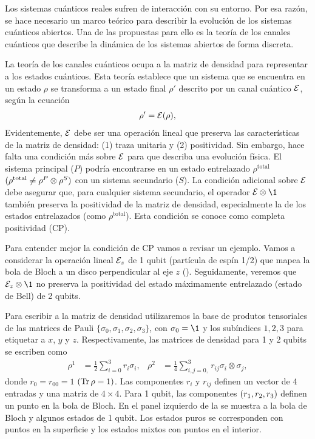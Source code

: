 Los sistemas cuánticos reales sufren de interacción con su entorno.
Por esa razón, se hace necesario un marco teórico para describir 
la evolución de los sistemas cuánticos abiertos. Una de las propuestas
para ello es la teoría de los canales cuánticos que describe la dinámica de 
los sistemas abiertos de forma discreta. 

La teoría de los canales cuánticos ocupa a la matriz de densidad para 
representar a los estados cuánticos. Esta teoría establece que un 
sistema que se encuentra en un estado $\rho$ se transforma a un 
estado final $\rho'$ descrito por un canal cuántico
$\mathcal{E}$, según la ecuación~\cite{nielsen_chuang_2011}
\begin{align} \label{eq:E(rho)}
\rho' = \mathcal{E} (\rho),
\end{align} 
Evidentemente, $\mathcal{E}$ debe ser una operación lineal 
que preserva las características de la matriz de densidad: (1) traza
unitaria y (2) positividad. Sin embargo, hace falta una condición 
más sobre $\mathcal{E}$ para que describa una evolución física. El sistema
principal ($P$) podría encontrarse en un estado entrelazado 
$\rho^{\text{total}}$ $(\rho^{\text{total}}\neq \rho^P\otimes\rho^S)$ 
con un sistema secundario ($S$). La condición adicional sobre $\mathcal{E}$ 
debe asegurar que, para cualquier sistema secundario, el operador $\E\ot\1$ 
también preserva la positividad de la matriz de densidad, especialmente 
la de los estados entrelazados (como $\rho^{\text{total}}$). Esta 
condición se conoce como completa positividad (CP).

Para entender mejor la condición de CP vamos a revisar un 
ejemplo. Vamos a considerar la operación lineal $\mathcal{E}_z$ de 1 qubit (partícula
de espín 1/2) que mapea la bola de Bloch a un disco perpendicular 
al eje $z$ (). 
Seguidamente, veremos que $\E_z \ot\1$ no preserva la
positividad del estado máximamente entrelazado (estado de Bell)
de 2 qubits.

Para escribir a la matriz de densidad utilizaremos 
la base de produtos tensoriales de las matrices de Pauli
$\{ \sigma_0, \sigma_1, \sigma_2, \sigma_3\}$,
con $\sigma_0=\1$ y los subíndices $1,2,3$ para etiquetar a $x$, $y$ y $z$.
Respectivamente, las matrices de densidad para 1 y 2 qubits se 
escriben como~\cite{nielsen_chuang_2011}
\begin{align}
\rho^1&=\frac{1}{2}\sum_{i=0}^{3} r_i\sigma_i,
& 
\rho^2&=\frac{1}{4}\sum _{i,j=0, }^{3}r_{ij}\sigma_i\otimes\sigma_j,
\label{eq:densityMatrices_1and2Qubits}
\end{align}
donde $r_0=r_{00}=1$ $(\Tr\rho=1)$.
Las componentes $r_i$ y $r_{ij}$ definen un vector de 4 entradas
y una matriz de $4\times4$.
Para 1 qubit, las componentes $\qty(r_1, r_2, r_3)$ definen 
un punto en la bola de Bloch.
En el panel izquierdo de la  
se muestra a la bola de Bloch y algunos estados de 1 qubit. 
Los estados puros se corresponden con puntos en la superficie
y los estados mixtos con puntos en el interior.


